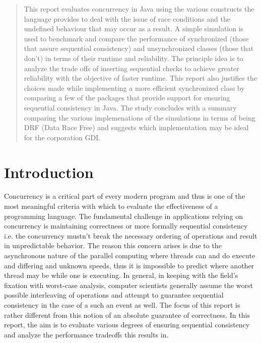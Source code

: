 \begin{abstract}
This report evaluates concurrency in Java using the various constructs the language provides to deal with the issue of race conditions and the undefined behaviour that may occur as a result. A simple simulation is used to benchmark and compare the performance of synchronized (those that assure sequential consistency) and unsynchronized classes (those that don't) in terms of their runtime and reliability. The principle idea is to analyze the trade offs of inserting sequential checks to achieve greater reliability with the objective of faster runtime. This report also justifies the choices made while implementing a more efficient synchronized class by comparing a few of the packages that provide support for ensuring sequential consistency in Java. The study concludes with a summary comparing the various implemenations of the simulations in terms of being DRF (Data Race Free) and suggests which implementation may be ideal for the corporation GDI. 
\end{abstract}

\section{Introduction}

Concurrency is a critical part of every modern program and thus is one of the most meaningful criteria with which to evaluate the effectiveness of a programming language. The fundamental challenge in applications relying on concurrency is maintaining correctness or more formally sequential consistency i.e. the concurrency mustn't break the necessary ordering of operations and result in unpredictable behavior. 
The reason this concern arises is due to the asynchronous nature of the parallel computing where threads can and do execute and differing and unknown speeds, thus it is impossible to predict where another thread may be while one is executing. 
In general, in keeping with the field's fixation with worst-case analysis, computer scientists generally assume the worst possible interleaving of operations and attempt to guarantee sequential consistency in the case of a such an event as well. The focus of this report is rather different from this notion of an absolute guarantee of correctness. In this report, the aim is to evaluate various degrees of ensuring sequential consistency and analyze the performance tradeoffs this results in. 
